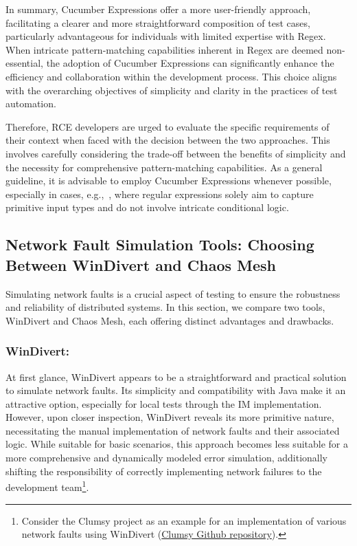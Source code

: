 In summary, Cucumber Expressions offer a more user-friendly approach, facilitating a clearer and more straightforward composition of test cases, particularly advantageous for individuals with limited expertise with Regex. When intricate pattern-matching capabilities inherent in Regex are deemed non-essential, the adoption of Cucumber Expressions can significantly enhance the efficiency and collaboration within the development process. This choice aligns with the overarching objectives of simplicity and clarity in the practices of test automation.

Therefore, \ac{RCE} developers are urged to evaluate the specific requirements of their context when faced with the decision between the two approaches. This involves carefully considering the trade-off between the benefits of simplicity and the necessity for comprehensive pattern-matching capabilities. As a general guideline, it is advisable to employ Cucumber Expressions whenever possible, especially in cases, e.g.,~, where regular expressions solely aim to capture primitive input types and do not involve intricate conditional logic.

\subsection{Network Fault Simulation Tools: Choosing Between WinDivert and Chaos Mesh}
\label{subsec:network-fault-wdiviert-chaos-mesh}
Simulating network faults is a crucial aspect of testing to ensure the robustness and reliability of distributed systems. In this section, we compare two tools, WinDivert and Chaos Mesh, each offering distinct advantages and drawbacks.

\subsubsection{WinDivert:}
At first glance, WinDivert appears to be a straightforward and practical solution to simulate network faults. Its simplicity and compatibility with Java make it an attractive option, especially for local tests through the \ac{IM} implementation. However, upon closer inspection, WinDivert reveals its more primitive nature, necessitating the manual implementation of network faults and their associated logic. While suitable for basic scenarios, this approach becomes less suitable for a more comprehensive and dynamically modeled error simulation, additionally shifting the responsibility of correctly implementing network failures to the development team\footnote{Consider the Clumsy project as an example for an implementation of various network faults using WinDivert (\href{https://github.com/jagt/clumsy}{Clumsy Github repository}).}.


